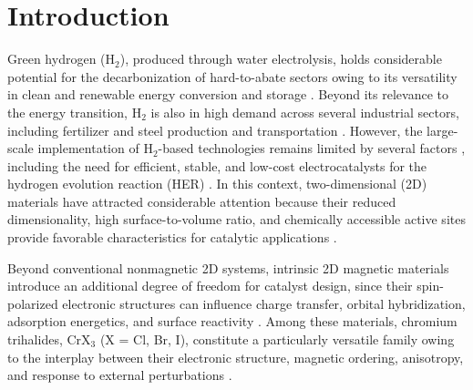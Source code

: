 \documentclass[journal=jacsat,manuscript=article]{achemso}
\begin{document}

\section{Introduction}

\noindent Green hydrogen (H$_2$), produced through water electrolysis, holds considerable potential for the decarbonization of hard-to-abate sectors owing to its versatility in clean and renewable energy conversion and storage \cite{ZAINAL2024113941, SAKTHIMURUGAN2025104849}. Beyond its relevance to the energy transition, H$_2$ is also in high demand across several industrial sectors, including fertilizer and steel production and transportation \cite{pr12020315, ROPER2025687}. However, the large-scale implementation of H$_2$-based technologies remains limited by several factors \cite{SAKTHIMURUGAN2025104849, Odenweller2025}, including the need for efficient, stable, and low-cost electrocatalysts for the hydrogen evolution reaction (HER) \cite{Liao2022,Ipaves2025,doi:10.1021/acsaem.6c00060,doi:10.1021/acsomega.5c07529,quispe2026controllingactivitystabilitygamma}. In this context, two-dimensional (2D) materials have attracted considerable attention because their reduced dimensionality, high surface-to-volume ratio, and chemically accessible active sites provide favorable characteristics for catalytic applications \cite{doi:10.1021/acsaem.6c00060, DEYACSAPPENERMATER2026}.

Beyond conventional nonmagnetic 2D systems, intrinsic 2D magnetic materials introduce an additional degree of freedom for catalyst design, since their spin-polarized electronic structures can influence charge transfer, orbital hybridization, adsorption energetics, and surface reactivity \cite{Ipaves2025,doi:10.1021/acscatal.2c06319,Sun2023,Duan2021}. Among these materials, chromium trihalides, CrX$_3$ (X = Cl, Br, I), constitute a particularly versatile family owing to the interplay between their electronic structure, magnetic ordering, anisotropy, and response to external perturbations \cite{Soriano2020,Besbes2019,Lee2026,Kvashnin2020,GarridoAldea2025}.
\end{document}
